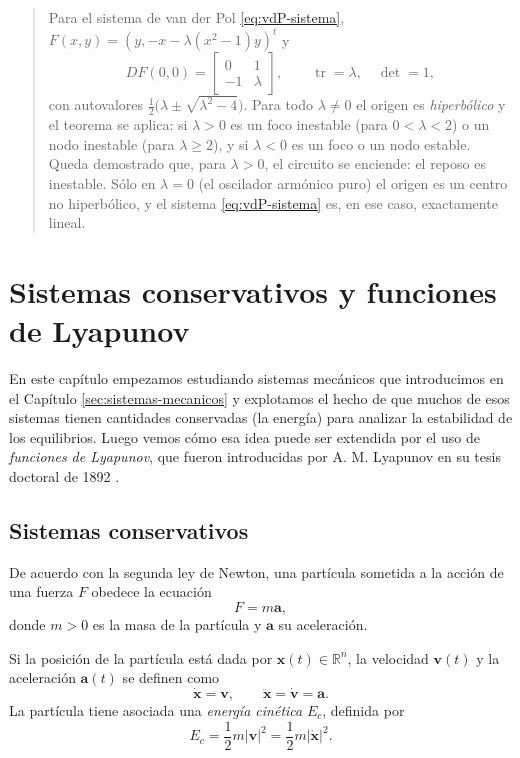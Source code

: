 \documentclass[12pt, a4paper]{amsbook}
\newcommand{\tr}{\operatorname{tr}}
\newcommand{\R}{{\mathbb R}}
\newcommand{\ab}{{\mathbf a}}
\newcommand{\vv}{{\mathbf v}}
\newcommand{\xx}{{\mathbf x}}
\theoremstyle{remark}
\theoremstyle{definition}
\numberwithin{section}{chapter}
\numberwithin{subsection}{section}
\numberwithin{equation}{section}
\numberwithin{figure}{chapter}
\newenvironment{volvemos}[1]{\medskip\par\noindent\begin{quote}\noindent{\bf Volvemos al problema: #1.}\par\smallskip}{\end{quote}\medskip}
\begin{document}
\begin{volvemos}{el circuito}
Para el sistema de van der Pol \eqref{eq:vdP-sistema}, $F(x,y) = (y, -x-\lambda(x^2-1)y)^t$ y
$$
DF(0,0) = \begin{bmatrix} 0 & 1\\ -1 & \lambda\end{bmatrix},\qquad \tr = \lambda,\quad \det = 1,
$$
con autovalores $\frac12\bigl(\lambda\pm\sqrt{\lambda^2-4}\bigr)$. Para todo $\lambda\neq 0$ el origen es \emph{hiperbólico} y el teorema se aplica: si $\lambda>0$ es un foco inestable (para $0<\lambda<2$) o un nodo inestable (para $\lambda\ge 2$), y si $\lambda<0$ es un foco o un nodo estable. Queda demostrado que, para $\lambda>0$, el circuito se enciende: el reposo es inestable. Sólo en $\lambda=0$ (el oscilador armónico puro) el origen es un centro no hiperbólico, y el sistema \eqref{eq:vdP-sistema} es, en ese caso, exactamente lineal.
\end{volvemos}

\chapter{Sistemas conservativos y funciones de Lyapunov}\label{cap:lyapunov}

En este capítulo empezamos estudiando sistemas mecánicos que introducimos en el Capítulo \ref{sec:sistemas-mecanicos} y explotamos el hecho de que muchos de esos sistemas tienen cantidades conservadas (la energía) para analizar la estabilidad de los equilibrios. Luego vemos cómo esa idea puede ser extendida por el uso de {\em funciones de Lyapunov}, que fueron introducidas por A. M. Lyapunov en su tesis doctoral de 1892 \cite{Lyapunov}.

\section{Sistemas conservativos}

De acuerdo con la segunda ley de Newton, una partícula sometida a la acción de una fuerza $F$ obedece la ecuación
$$
F = m \ab,
$$
donde $m>0$ es la masa de la partícula y $\ab$ su aceleración.

Si la posición de la partícula está dada por $\xx(t)\in\R^n$, la velocidad $\vv(t)$ y la aceleración $\ab(t)$ se definen como
$$
\dot\xx = \vv,
\qquad
\ddot\xx = \dot\vv = \ab.
$$
La partícula tiene asociada una \emph{energía cinética} $E_c$, definida por
$$
E_c = \frac12 m |\vv|^2 = \frac12 m |\dot\xx|^2.
$$
\end{document}

